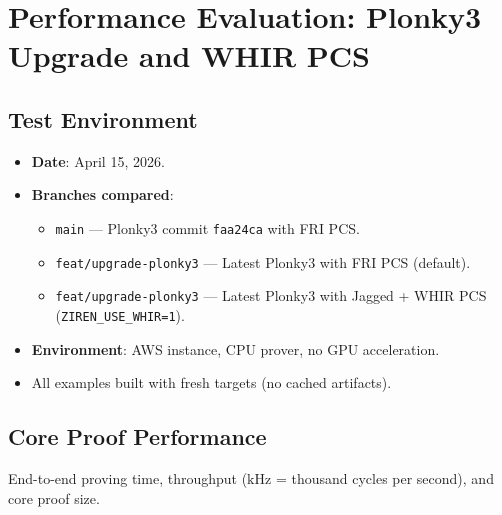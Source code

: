 \section{Performance Evaluation: Plonky3 Upgrade and WHIR PCS}
\label{sec:performance}

\subsection{Test Environment}

\begin{itemize}
  \item \textbf{Date}: April 15, 2026.
  \item \textbf{Branches compared}:
    \begin{itemize}
      \item \texttt{main} --- Plonky3 commit \texttt{faa24ca} with FRI PCS.
      \item \texttt{feat/upgrade-plonky3} --- Latest Plonky3 with FRI PCS (default).
      \item \texttt{feat/upgrade-plonky3} --- Latest Plonky3 with Jagged + WHIR PCS (\texttt{ZIREN\_USE\_WHIR=1}).
    \end{itemize}
  \item \textbf{Environment}: AWS instance, CPU prover, no GPU acceleration.
  \item All examples built with fresh targets (no cached artifacts).
\end{itemize}

\subsection{Core Proof Performance}

End-to-end proving time, throughput ($\text{kHz}$ = thousand cycles per second), and core proof size.

